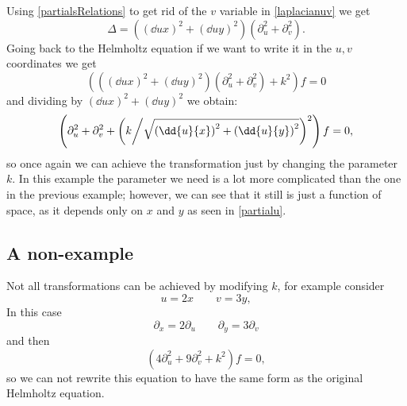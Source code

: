Using \eqref{partialsRelations} to get rid of the \(v\) variable in \eqref{laplacianuv} we get
\begin{equation}\label{laplacianuvsimplified}
	\Delta=\left(
	\left(\dd{u}{x}\right)^2
	+\left(\dd{u}{y}\right)^2\right)
	\left(\partial_u^2+\partial_v^2 \right).
\end{equation}
Going back to the Helmholtz equation if we want to write it in the \(u,v\)
coordinates we get
\begin{equation*}
\left(
\left(\left(\dd{u}{x}\right)^2
+\left(\dd{u}{y}\right)^2\right)
\left(\partial_u^2+\partial_v^2\right)+ k^2\right)f=0
\end{equation*}
and dividing by \(\left(\dd{u}{x}\right)^2
+\left(\dd{u}{y}\right)^2\) we obtain:
\begin{equation}
\left(
	\partial_u^2+\partial_v^2
	+\left(
	k\middle/\sqrt{\left(\dd{u}{x}\right)^2
	+\left(\dd{u}{y}\right)^2}
	\right)^2
\right)f=0,
\end{equation}
so once again we can achieve the transformation just by changing the
parameter \(k\). In this example the parameter we need is a lot more
complicated than the one in the previous example; however, we can see that it
still is just a function of space, as it depends only on \(x\) and \(y\) as
seen in \eqref{partialu}.
\subsection{A non-example}
Not all transformations can be achieved by modifying \(k\), for example consider
\begin{equation*}
	u=2x \qquad
	v=3y,
\end{equation*}
In this case
\begin{equation*}
	\partial_x=2\partial_u \qquad
	\partial_y=3\partial_v
\end{equation*}
and then
\begin{equation*}
	(4\partial_u^2 + 9\partial_v^2 + k^2)f=0,
\end{equation*}
so we can not rewrite this equation to have the same form as the original
Helmholtz equation.
